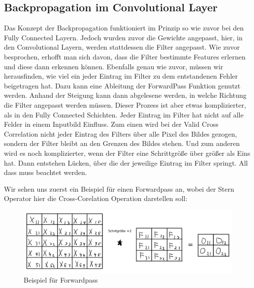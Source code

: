 \documentclass[12pt]{article}
\begin{document}
\subsection{Backpropagation im Convolutional Layer}
Das Konzept der Backpropagation funktioniert im Prinzip so wie zuvor bei den Fully Connected Layern. Jedoch wurden zuvor die Gewichte angepasst, hier, in den Convolutional Layern, werden stattdessen die Filter angepasst. Wie zuvor besprochen, erhofft man sich davon, dass die Filter bestimmte Features erlernen und diese dann erkennen können.
Ebenfalls genau wie zuvor, müssen wir herausfinden, wie viel ein jeder Eintrag im Filter zu dem entstandenen Fehler beigetragen hat. Dazu kann eine Ableitung der ForwardPass Funktion genutzt werden. Anhand der Steigung kann dann abgelesene werden, in welche Richtung die Filter angepasst werden müssen. Dieser Prozess ist aber etwas komplizierter, als in den Fully Connected Schichten. Jeder Eintrag im Filter hat nicht auf alle Felder in einem Inputbild Einfluss. Zum einen wird bei der Valid Cross Correlation nicht jeder Eintrag des Filters über alle Pixel des Bildes gezogen, sondern der Filter bleibt an den Grenzen des Bildes stehen. Und zum anderen wird es noch komplizierter, wenn der Filter eine Schrittgröße über größer als Eins hat. Dann entstehen Lücken, über die der jeweilige Eintrag im Filter springt. All dass muss beachtet werden. 

Wir sehen uns zuerst ein Beispiel für einen Forwardpass an, wobei der Stern Operator hier die Cross-Corelation Operation darstellen soll:
\begin{figure}[H]
\centering
\includegraphics[scale=0.27]{Images/010_ForwardPassConvolution.png}
\caption{Beispiel für Forwardpass}
\label{Beispiel für Forwardpass}
\end{figure}
\end{document}
